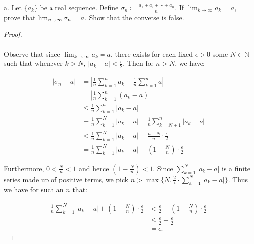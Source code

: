 a.  Let $\{a_k\}$ be a real sequence. Define
    $\sigma_n \coloneqq \frac{a_1 + a_2 + \cdots + a_n}{n}$. If 
    $\lim_{k \rightarrow \infty}{a_k} = a$, prove that
     ${\lim_{n \rightarrow \infty}{\sigma_n}} = a$.  Show that the converse is
    false.

    \begin{proof}\ \\\\

        Observe that since $\lim_{k \rightarrow \infty}{a_k} = a$, there exists
        for each fixed $\epsilon > 0$ some $N \in \mathbb{N}$ such that
        whenever $k > N$, $|a_k - a| < \frac{\epsilon}{2}$. Then for
        $n > N$, we have:

        \begin{align*}
            |\sigma_n - a|
             &= \left|\frac{1}{n}\sum\limits_{k=1}^{n}{a_k} - \frac{1}{n}\sum\limits_{k=1}^{n}{a} \right| \\
             &= \left|\frac{1}{n}\sum\limits_{k=1}^{n}{\left(a_k - a\right)} \right| \\
             &\le \frac{1}{n}\sum\limits_{k=1}^{n}{|a_k - a|} \\
             &= \frac{1}{n}\sum\limits_{k=1}^{N}{|a_k - a|} + \frac{1}{n}\sum\limits_{k=N+1}^{n}{|a_k - a|} \\
             &< \frac{1}{n}\sum\limits_{k=1}^{N}{|a_k - a|} + \frac{n - N}{n} \cdot \frac{\epsilon}{2} \\
             &= \frac{1}{n}\sum\limits_{k=1}^{N}{|a_k - a|} + \left(1 - \frac{N}{n}\right) \cdot \frac{\epsilon}{2}
        \end{align*}

        Furthermore, $0 < \frac{N}{n} < 1$ and hence 
        $\left(1 - \frac{N}{n}\right) < 1$. Since 
        $\sum\limits_{k=1}^{N}{|a_k - a|}$ is a finite series made up of
        positive terms, we pick
        $n > \max{\{N, \frac{2}{\epsilon} \cdot \sum\limits_{k=1}^{N}{|a_k - a|}\}}$.
        Thus we have for such an $n$ that:

        \begin{align*}
            \frac{1}{n}\sum\limits_{k=1}^{N}{|a_k - a|} + \left(1 - \frac{N}{n}\right) \cdot \frac{\epsilon}{2}
              &< \frac{\epsilon}{2} + \left(1 - \frac{N}{n}\right) \cdot \frac{\epsilon}{2} \\
              &\le \frac{\epsilon}{2} + \frac{\epsilon}{2} \\
              &= \epsilon.
        \end{align*}


\end{proof}
